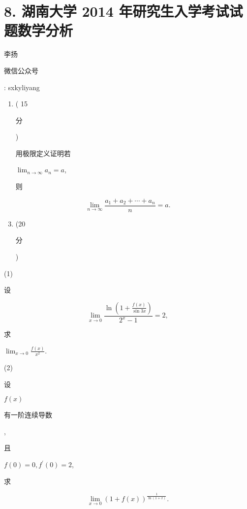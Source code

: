 \documentclass[10pt]{article}
\begin{document}
\section{8. 湖南大学 2014 年研究生入学考试试题数学分析}
\begin{CJK}{UTF8}{mj}李扬\end{CJK}

\begin{CJK}{UTF8}{mj}微信公众号\end{CJK}: sxkyliyang

\begin{enumerate}
  \item ( 15 \begin{CJK}{UTF8}{mj}分\end{CJK}) \begin{CJK}{UTF8}{mj}用极限定义证明若\end{CJK} $\lim _{n \rightarrow \infty} a_{n}=a$, \begin{CJK}{UTF8}{mj}则\end{CJK}
\end{enumerate}
$$
\lim _{n \rightarrow \infty} \frac{a_{1}+a_{2}+\cdots+a_{n}}{n}=a .
$$

\begin{enumerate}
  \setcounter{enumi}{2}
  \item (20 \begin{CJK}{UTF8}{mj}分\end{CJK})
\end{enumerate}
(1) \begin{CJK}{UTF8}{mj}设\end{CJK}
$$
\lim _{x \rightarrow 0} \frac{\ln \left(1+\frac{f(x)}{\sin 3 x}\right)}{2^{x}-1}=2,
$$
\begin{CJK}{UTF8}{mj}求\end{CJK} $\lim _{x \rightarrow 0} \frac{f(x)}{x^{2}}$.

(2) \begin{CJK}{UTF8}{mj}设\end{CJK} $f(x)$ \begin{CJK}{UTF8}{mj}有一阶连续导数\end{CJK}, \begin{CJK}{UTF8}{mj}且\end{CJK} $f(0)=0, f^{\prime}(0)=2$, \begin{CJK}{UTF8}{mj}求\end{CJK}
$$
\lim _{x \rightarrow 0}(1+f(x))^{\frac{1}{\ln (1+x)}} .
$$
\end{document}

